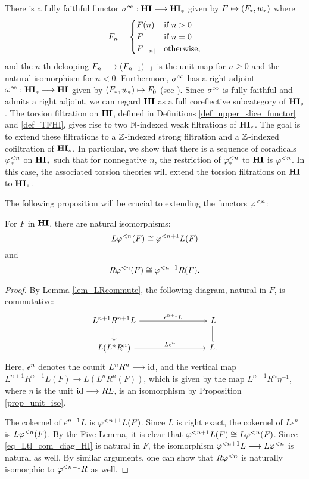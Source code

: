 There is a fully faithful functor $\spectHI: \HI \to \HM$ given
by $F \mapsto (F_*, \deloop_*)$ where
\[
F_n = \begin{cases}
F(n) &\textrm{if }n > 0 \\
F    &\textrm{if }n = 0 \\
\RHI[|n|]F &\textrm{otherwise},
\end{cases}
\]
and the $n$-th delooping $F_n \to \RHI{(F_{n + 1})}$ is the unit map
for $n \geq 0$ and the natural isomorphism for $n < 0$. Furthermore,
$\spectHI$ has a right adjoint $\loopHM: \HM \to \HI$ given by
$(F_*, \deloop_*) \mapsto F_0$ (see \cite[1.18]{DegModHom}).  Since
$\spectHI$ is fully faithful and admits a right adjoint, we can regard
$\HI$ as a full coreflective subcategory of $\HM$. The torsion
filtration on $\HI$, defined in Definitions
\ref{def_upper_slice_functor} and \ref{def_TFHI},
gives rise to two $\N$-indexed weak filtrations of $\HM$. The goal 
is to extend these filtrations to a $\Z$-indexed strong filtration 
and a $\Z$-indexed cofiltration of $\HM$. In particular, we show
that there is a sequence of coradicals $\tlHM{n}$
on $\HM$ such that for nonnegative $n$, the restriction of 
$\tlHM{n}$ to $\HI$ is $\tlHI{n}$. In this case, the associated
torsion theories will extend the torsion 
filtrations on $\HI$ to $\HM$.

The following proposition will be crucial to extending the 
functors $\tlHI{n}$:

\begin{prop}\label{prop_tl_L_R}
For $F$ in $\HI$, there are natural isomorphisms:
\[
L \tlHI{n}(F) \cong \tlHI{n + 1} L(F)
\]
and
\[
R\tlHI{n}(F) \cong \tlHI{n - 1}R(F).
\] 
\end{prop}
\begin{proof}
By Lemma \ref{lem_LRcommute}, the following diagram, natural in $F$, 
is commutative:
\begin{equation}\label{eq_Ltl_com_diag_HI}
\begin{tikzcd}[column sep=80pt]
L^{n + 1}R^{n + 1}L \arrow{r}{\cuHI^{n + 1}L} \arrow{d} &
L \arrow[equals]{d} \\
L(L^{n}R^n) \arrow{r}{L\cuHI^{n}} &
L.
\end{tikzcd}
\end{equation}
Here, $\cuHI^n$ denotes the counit $L^nR^n \to \id$,
and the vertical map $L^{n + 1}R^{n + 1}L(F) \to L(L^nR^n (F))$, which is 
given by the map $L^{n + 1}R^n \eta^{-1}$, where $\eta$ is
the unit $\id \to RL$, is an isomorphism by Proposition 
\ref{prop_unit_iso}.

The cokernel of $\cuHI^{n + 1}L$ is $\tlHI{n + 1}L(F)$. Since $L$ 
is right exact, the cokernel of $L\epsilon^n$ is $L\tlHI{n}(F)$. 
By the Five Lemma, it is clear that $\tlHI{n + 1}L(F) \cong 
L\tlHI{n}(F)$. Since \eqref{eq_Ltl_com_diag_HI} is natural in $F$,
the isomorphism $\tlHI{n + 1}L \to L\tlHI{n}$ is natural as well.
By similar arguments, one can show that $R\tlHI{n}$ is naturally
isomorphic to $\tlHI{n - 1}R$ as well.
\end{proof}

